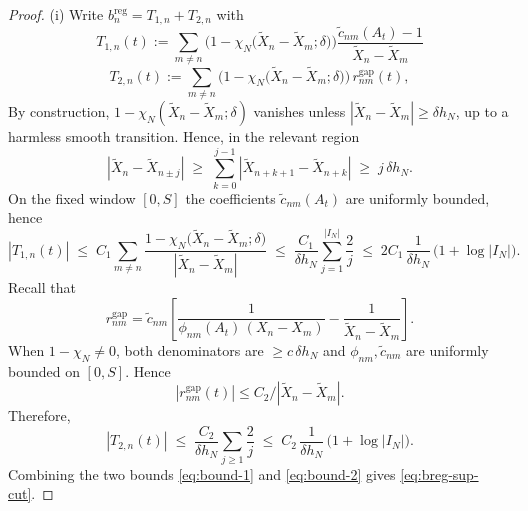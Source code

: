 \documentclass[12pt,reqno]{amsart}
\theoremstyle{plain}
\theoremstyle{definition}
\theoremstyle{remark}
\begin{document}
\begin{proof} 

(i) Write $b^{\mathrm{reg}}_{n}=T_{1,n}+T_{2,n}$ with
\begin{equation}
T_{1,n}(t):=\sum_{m\neq n}
\Big(1-\chi_N\!\big(\widetilde X_n-\widetilde X_m;\delta\big)\Big)
\frac{\widetilde c_{nm}(A_t)-1}{\widetilde X_n-\widetilde X_m} 
\end{equation}
\begin{equation}
T_{2,n}(t):=\sum_{m\neq n}
\Big(1-\chi_N\!\big(\widetilde X_n-\widetilde X_m;\delta\big)\Big)\, r^{\mathrm{gap}}_{nm}(t),
\end{equation}
By construction, $1-\chi_N(\widetilde X_n-\widetilde X_m;\delta)$ vanishes unless
$|\widetilde X_n-\widetilde X_m|\ge \delta h_N$, up to a harmless smooth
transition. Hence, in the relevant region 
\begin{equation}\label{eq:LB}
|\widetilde X_n-\widetilde X_{n\pm j}|
\;\ge\; \sum_{k=0}^{j-1}|\widetilde X_{n+k+1}-\widetilde X_{n+k}|
\;\ge\; j\,\delta h_N .
\end{equation}
On the fixed window $[0,S]$ the coefficients $\widetilde c_{nm}(A_t)$ are
uniformly bounded, hence
\begin{equation}
\label{eq:bound-1}
|T_{1,n}(t)|
\;\le\; C_1 \sum_{m\neq n}\frac{1-\chi_N\!\big(\widetilde X_n-\widetilde X_m;\delta\big)}
{|\widetilde X_n-\widetilde X_m|}
\;\le\; \frac{C_1}{\delta h_N}\sum_{j=1}^{|I_N|}\frac{2}{j}
\;\le\;2  C_1 \,\frac{1}{\delta h_N}\,\big(1+\log |I_N|\big).
\end{equation} 
Recall that
\begin{equation}
r^{\mathrm{gap}}_{nm}
=\widetilde c_{nm}\left[\frac{1}{\phi_{nm}(A_t)\,(X_n-X_m)}
-\frac{1}{\widetilde X_n-\widetilde X_m}\right].
\end{equation}
When $1-\chi_N\neq 0$, both denominators are $\ge c\,\delta h_N$ and
$\phi_{nm},\widetilde c_{nm}$ are uniformly bounded on $[0,S]$. Hence 
\begin{equation}
|r^{\mathrm{gap}}_{nm}(t)|\le C_{2}/|\widetilde X_n-\widetilde X_m|.
\end{equation}
Therefore,
\begin{equation}
\label{eq:bound-2}
|T_{2,n}(t)|
\;\le\; \frac{C_2}{\delta h_N}\sum_{j\ge1}\frac{2}{j}
\;\le\; C_{2}\,\frac{1}{\delta h_N}\,\big(1+\log |I_N|\big).
\end{equation}
Combining the two bounds \eqref{eq:bound-1} and \eqref{eq:bound-2} gives \eqref{eq:breg-sup-cut}.


\end{proof}
\end{document}
